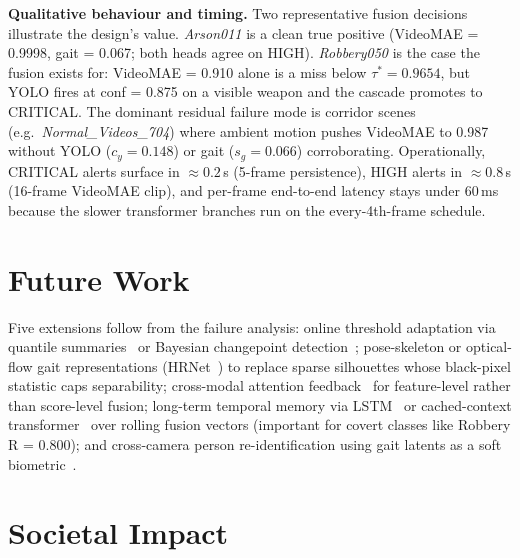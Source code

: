 \documentclass[runningheads]{llncs}
\begin{document}
\textbf{Qualitative behaviour and timing.} Two representative fusion decisions illustrate the design's value. \emph{Arson011} is a clean true positive (VideoMAE = 0.9998, gait = 0.067; both heads agree on HIGH). \emph{Robbery050} is the case the fusion exists for: VideoMAE = 0.910 alone is a miss below $\tau^* = 0.9654$, but YOLO fires at conf = 0.875 on a visible weapon and the cascade promotes to CRITICAL. The dominant residual failure mode is corridor scenes (e.g.\ \emph{Normal\_Videos\_704}) where ambient motion pushes VideoMAE to 0.987 without YOLO ($c_y = 0.148$) or gait ($s_g = 0.066$) corroborating. Operationally, CRITICAL alerts surface in $\approx 0.2$\,s (5-frame persistence), HIGH alerts in $\approx 0.8$\,s (16-frame VideoMAE clip), and per-frame end-to-end latency stays under 60\,ms because the slower transformer branches run on the every-4th-frame schedule.

\section{Future Work}\label{sec:future}

Five extensions follow from the failure analysis: online threshold adaptation via quantile summaries~\cite{greenwald2001} or Bayesian changepoint detection~\cite{adams2007}; pose-skeleton or optical-flow gait representations (HRNet~\cite{sun2019hrnet}) to replace sparse silhouettes whose black-pixel statistic caps separability; cross-modal attention feedback~\cite{tsai2019multimodal,vaswani2017attention} for feature-level rather than score-level fusion; long-term temporal memory via LSTM~\cite{hochreiter1997lstm} or cached-context transformer~\cite{dai2019transformerxl} over rolling fusion vectors (important for covert classes like Robbery R = 0.800); and cross-camera person re-identification using gait latents as a soft biometric~\cite{ye2021deep,chao2019gaitset}.

\section{Societal Impact}\label{sec:impact}
\end{document}
